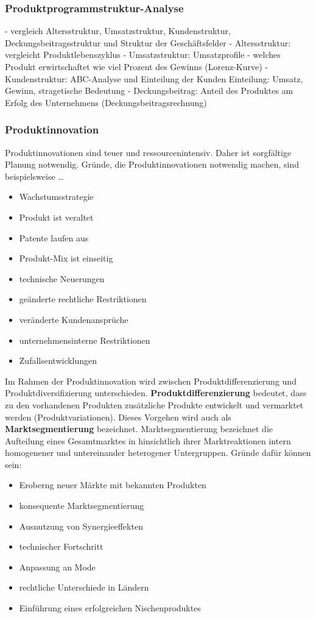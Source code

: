 {\subsubsection{Produktprogrammstruktur-Analyse}
	- vergleich Altersstruktur, Umsatzstruktur, Kundenstruktur,
	 Deckungsbeitragsstruktur und Struktur der Geschäftsfelder
		- Altersstruktur: vergleicht Produktlebenszyklus
		- Umsatzstruktur: Umsatzprofile - welches Produkt
		 erwirtschaftet wie viel Prozent des Gewinns (Lorenz-Kurve)
		- Kundenstruktur: ABC-Analyse und Einteilung der Kunden
		 Einteilung: Umsatz, Gewinn, stragetische Bedeutung
		- Deckungsbeitrag: Anteil des Produktes am Erfolg des
		 Unternehmens (Deckungsbeitragsrechnung)

\subsubsection{Produktinnovation}

Produktinnovationen sind teuer und ressourcenintensiv. Daher ist sorgfältige Planung notwendig. Gründe, die Produktinnovationen notwendig machen, sind beispielsweise \dots
\begin{itemize}
	\item Wachstumsstrategie
	\item Produkt ist veraltet
	\item Patente laufen aus
	\item Produkt-Mix ist einseitig
	\item technische Neuerungen
	\item geänderte rechtliche Restriktionen
	\item veränderte Kundenansprüche
	\item unternehmensinterne Restriktionen
	\item Zufallsentwicklungen
\end{itemize}

Im Rahmen der Produktinnovation wird zwischen Produktdifferenzierung und Produktdiversifizierung unterschieden. {\bf Produktdifferenzierung} bedeutet, dass zu den vorhandenen Produkten zusätzliche Produkte entwickelt und vermarktet werden (Produktvariationen). Dieses Vorgehen wird auch als {\bf Marktsegmentierung} bezeichnet. Marktsegmentierung bezeichnet die Aufteilung eines Gesamtmarktes in hinsichtlich ihrer Marktreaktionen intern homogenener und untereinander heterogener Untergruppen. Gründe dafür können sein:

\begin{itemize}
	\item Eroberng neuer Märkte mit bekannten Produkten
	\item konsequente Marktsegmentierung
	\item Ausnutzung von Synergieeffekten
	\item technischer Fortschritt
	\item Anpassung an Mode
	\item {rechtliche Unterschiede in Ländern}
	\item Einführung eines erfolgreichen Nischenproduktes
\end{itemize}

}
